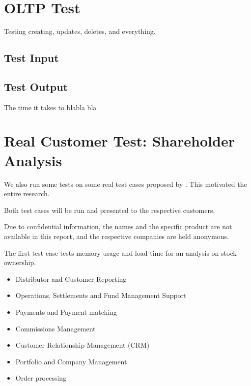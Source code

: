 \section{OLTP Test}
\label{sec:OLTP Test}
Testing creating, updates, deletes, and everything.

\subsection{Test Input}
\label{sub:Test Input}

\subsection{Test Output}
\label{sub:Test Output}
The time it takes to blabla bla


\section{Real Customer Test: Shareholder Analysis}
\label{sec:Real Customer Test: Shareholder Analysis}
We also run some tests on some real test cases proposed by \genus. This motivated the entire research.

Both test cases will be run and presented to the respective customers.

Due to confidential information, the names and the specific product are not available in this report, and the respective companies are held anonymous.

The first test case tests memory usage and load time for an analysis on stock ownership.
\begin{itemize}
    \item Distributor and Customer Reporting
    \item Operations, Settlements and Fund Management Support
    \item Payments and Payment matching
    \item Commissions Management
    \item Customer Relationship Management (CRM)
    \item Portfolio and Company Management
    \item Order processing
\end{itemize}





